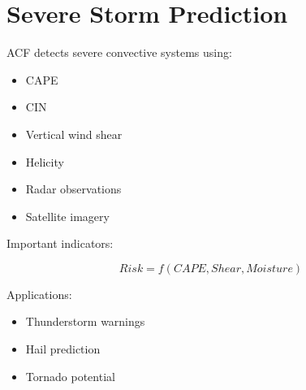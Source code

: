 \section{Severe Storm Prediction}


ACF detects severe convective systems using:


\begin{itemize}

\item CAPE

\item CIN

\item Vertical wind shear

\item Helicity

\item Radar observations

\item Satellite imagery

\end{itemize}



Important indicators:


\begin{equation}
Risk=f(CAPE,Shear,Moisture)
\end{equation}



Applications:

\begin{itemize}

\item Thunderstorm warnings

\item Hail prediction

\item Tornado potential

\end{itemize}

